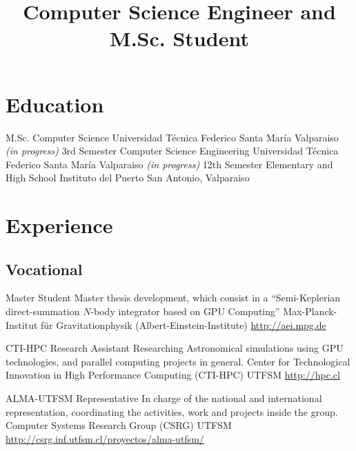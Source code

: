\documentclass[11pt,a4paper]{moderncv}
\title{\large Computer Science Engineer and M.Sc. Student}
\begin{document}
\maketitle

%
%
\section{Education}

        {M.Sc. Computer Science}
        {Universidad Técnica Federico Santa María}
        {Valparaiso}
        {\emph{(in progress)}}
        {3rd Semester}
        {Computer Science Engineering}
        {Universidad Técnica Federico Santa María}
        {Valparaiso}
        {\emph{(in progress)}}
        {12th Semester}
        {Elementary and High School}
        {Instituto del Puerto}
        {San Antonio, Valparaiso}
        {}{}

\vspace{-0.5cm}

%
%
\section{Experience}
\subsection{Vocational}

        {Master Student}
        {Master thesis development, which consist in a %
        ``Semi-Keplerian direct-summation $N$-body integrator based on %
        GPU Computing'' }
        {Max-Planck-Institut für Gravitationphysik (Albert-Einstein-Institute)}
        {}
        {\url{http://aei.mpg.de}}

        {CTI-HPC Research Assistant}
        {Researching Astronomical simulations using GPU technologies, %
        and parallel computing projects in general.}
        {Center for Technological Innovation in High Performance Computing (CTI-HPC)}
        {UTFSM}
        {\url{http://hpc.cl}}

        {ALMA-UTFSM Representative}
        {In charge of the national and international representation, coordinating the activities, work and projects inside the group.}
        {Computer Systems Research Group (CSRG)}
        {UTFSM}
        {\url{http://csrg.inf.utfsm.cl/proyectos/alma-utfsm/}}
\end{document}
